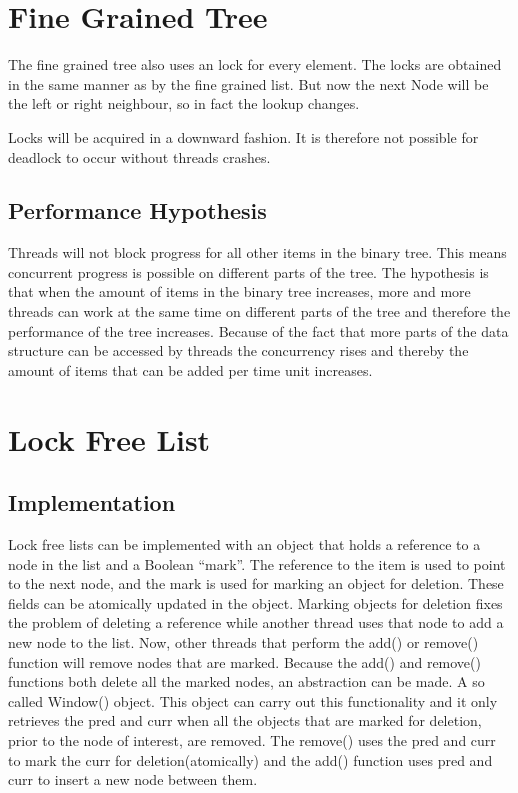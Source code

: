 \documentclass[10pt,a4paper]{article}
\begin{document}
\section{Fine Grained Tree}
The fine grained tree also uses an lock for every element. 
The locks are obtained in the same manner as by the fine 
grained list. But now the next Node will be the left or right neighbour, 
so in fact the lookup changes. 

Locks will be acquired in a downward fashion. It is therefore not possible for
deadlock to occur without threads crashes.

\subsection{Performance Hypothesis}
Threads will not block progress for all
other items in the binary tree. This means concurrent progress is possible on
different parts of the tree.  The hypothesis is that when the amount of items
in the binary tree increases, more and more threads can work at the same time
on different parts of the tree and therefore the performance of the tree
increases. Because of the fact that more parts of the data structure can be
accessed by threads the concurrency rises and thereby the amount of items that
can be added per time unit increases.


\section{Lock Free List}
\subsection{Implementation}
Lock free lists can be implemented with an object that holds a reference to a node in the list and a
Boolean ``mark''. The reference to the item is used to point to the next node,
and the mark is used for marking an object for deletion. These fields can be
atomically updated in the object. Marking objects for deletion fixes the
problem of deleting a reference while another thread uses that node to add a
new node to the list. Now, other threads that perform the add() or remove()
function will remove nodes that are marked. Because the add() and remove()
functions both delete all the marked nodes, an abstraction can be made. A so
called Window() object. This object can carry out this functionality and it
only retrieves the pred and curr when all the objects that are marked for deletion,
prior to the node of interest, are removed. The remove() uses the
pred and curr to mark the curr for deletion(atomically) and the add() function
uses pred and curr to insert a new node between them.
\end{document}
